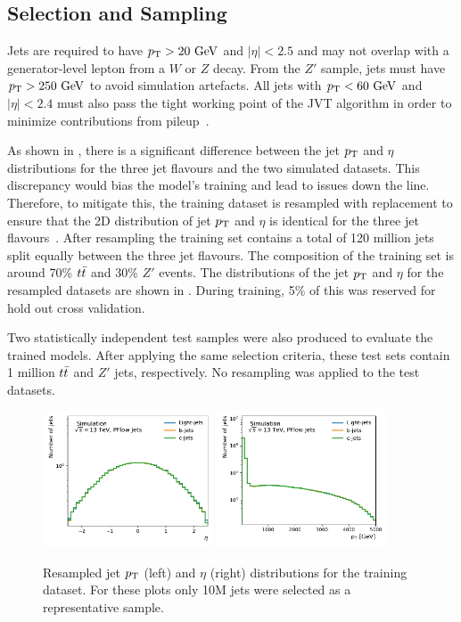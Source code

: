\subsection{Selection and Sampling}

Jets are required to have $\pt > 20~\GeV$ and $|\eta| < 2.5$ and may not overlap with a generator-level lepton from a $W$ or $Z$ decay.
From the $Z'$ sample, jets must have $\pt > 250~\GeV$ to avoid simulation artefacts.
All jets with $\pt < 60~\GeV$ and $|\eta| < 2.4$ must also pass the tight working point of the JVT algorithm in order to minimize contributions from pileup~\cite{JVT}.

As shown in , there is a significant difference between the jet $p_{\text{T}}$ and $\eta$ distributions for the three jet flavours and the two simulated datasets.
This discrepancy would bias the model's training and lead to issues down the line.
Therefore, to mitigate this, the training dataset is resampled with replacement to ensure that the 2D distribution of jet $p_{\text{T}}$ and $\eta$ is identical for the three jet flavours~\cite{AlexThesis}.
After resampling the training set contains a total of 120 million jets split equally between the three jet flavours.
The composition of the training set is around 70\% $t\bar{t}$ and 30\% $Z'$ events.
The distributions of the jet $p_{\text{T}}$ and $\eta$ for the resampled datasets are shown in .
During training, 5\% of this was reserved for hold out cross validation.

Two statistically independent test samples were also produced to evaluate the trained models.
After applying the same selection criteria, these test sets contain 1 million $t\bar{t}$ and $Z'$ jets, respectively.
No resampling was applied to the test datasets.

\begin{figure}
    \centering
    \includegraphics[width=0.45\textwidth]{figures/flavour_tagging/train_0.pdf}
    \includegraphics[width=0.45\textwidth]{figures/flavour_tagging/train_1.pdf}
    \caption{Resampled jet $p_{\text{T}}$ (left) and $\eta$ (right) distributions for the training dataset. For these plots only 10M jets were selected as a representative sample.}
    \label{fig:train_jet_pt_eta}
\end{figure}

